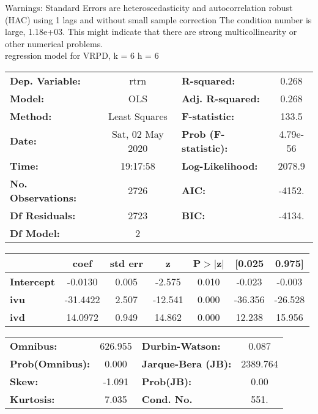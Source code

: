 Warnings: \newline
 [1] Standard Errors are heteroscedasticity and autocorrelation robust (HAC) using 1 lags and without small sample correction \newline
 [2] The condition number is large, 1.18e+03. This might indicate that there are \newline
 strong multicollinearity or other numerical problems.\\ 

regression model for VRPD, k = 6 h = 6\begin{center}
\begin{tabular}{lclc}
\toprule
\textbf{Dep. Variable:}    &       rtrn       & \textbf{  R-squared:         } &     0.268   \\
\textbf{Model:}            &       OLS        & \textbf{  Adj. R-squared:    } &     0.268   \\
\textbf{Method:}           &  Least Squares   & \textbf{  F-statistic:       } &     133.5   \\
\textbf{Date:}             & Sat, 02 May 2020 & \textbf{  Prob (F-statistic):} &  4.79e-56   \\
\textbf{Time:}             &     19:17:58     & \textbf{  Log-Likelihood:    } &    2078.9   \\
\textbf{No. Observations:} &        2726      & \textbf{  AIC:               } &    -4152.   \\
\textbf{Df Residuals:}     &        2723      & \textbf{  BIC:               } &    -4134.   \\
\textbf{Df Model:}         &           2      & \textbf{                     } &             \\
\bottomrule
\end{tabular}
\begin{tabular}{lcccccc}
                   & \textbf{coef} & \textbf{std err} & \textbf{z} & \textbf{P$> |$z$|$} & \textbf{[0.025} & \textbf{0.975]}  \\
\midrule
\textbf{Intercept} &      -0.0130  &        0.005     &    -2.575  &         0.010        &       -0.023    &       -0.003     \\
\textbf{ivu}       &     -31.4422  &        2.507     &   -12.541  &         0.000        &      -36.356    &      -26.528     \\
\textbf{ivd}       &      14.0972  &        0.949     &    14.862  &         0.000        &       12.238    &       15.956     \\
\bottomrule
\end{tabular}
\begin{tabular}{lclc}
\textbf{Omnibus:}       & 626.955 & \textbf{  Durbin-Watson:     } &    0.087  \\
\textbf{Prob(Omnibus):} &   0.000 & \textbf{  Jarque-Bera (JB):  } & 2389.764  \\
\textbf{Skew:}          &  -1.091 & \textbf{  Prob(JB):          } &     0.00  \\
\textbf{Kurtosis:}      &   7.035 & \textbf{  Cond. No.          } &     551.  \\
\bottomrule
\end{tabular}
\end{center}

